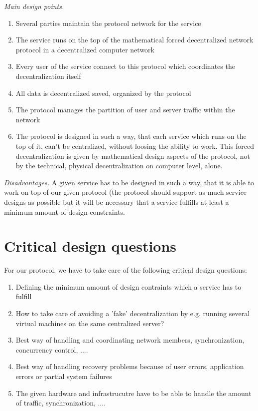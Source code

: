 \documentclass[12pt]{../document-templates/papers/one-column-mydashie/mydashie}
\newtheorem*{theorem A}{Theorem A}
\newtheorem*{theorem B}{N\"olker's Theorem}
\theoremstyle{remark}
\theoremstyle{remark}
\begin{document}
\vspace{0.3cm}
\textit{Main design points.}
\begin{enumerate}
	\item Several parties maintain the protocol network for the service
	\item The service runs on the top of the mathematical forced decentralized network protocol in a decentralized computer network
	\item Every user of the service connect to this protocol which coordinates the decentralization itself
	\item All data is decentralized saved, organized by the protocol
	\item The protocol manages the partition of user and server traffic within the network
	\item The protocol is designed in such a way, that each service which runs on the top of it, can't be centralized, without loosing the ability to work. This forced decentralization is given by mathematical design aspects of the protocol, not by the technical, physical decentralization on computer level, alone.
\end{enumerate}

\vspace{0.3cm}
\textit{Disadvantages.} A given service has to be designed in such a way, that it is able to work on top of our given protocol (the protocol should support as much service designs as possible but it will be necessary that a service fulfills at least a minimum amount of design constraints.
\section{Critical design questions}
\label{s:criticaldesignquestions}
For our protocol, we have to take care of the following critical design questions:
\begin{enumerate}
	\item Defining the minimum amount of design contraints which a service has to fulfill
	\item How to take care of avoiding a 'fake' decentralization by e.g. running several virtual machines on the same centralized server?
	\item Best way of handling and coordinating network members, synchronization, concurrency control, ....	
	\item Best way of handling recovery problems because of user errors, application errors or partial system failures
	\item The given hardware and infrastrucutre have to be able to handle the amount of traffic, synchronization, ....
\end{enumerate}
\end{document}
